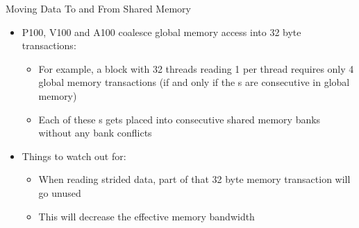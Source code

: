 \documentclass[aspectratio=43]{beamer}
\begin{document}
\begin{frame}[fragile]{Moving Data To and From Shared Memory}
    \begin{itemize}
        \item P100, V100 and A100 coalesce global memory access into 32 byte transactions:
        \begin{itemize}
            \item For example, a block with 32 threads reading 1  per thread requires only 4 global memory transactions (if and only if the s are consecutive in global memory)
            \item Each of these s gets placed into consecutive shared memory banks without any bank conflicts
        \end{itemize}
        \vspace{0.25cm}
        \item Things to watch out for:
            \begin{itemize}
                \item When reading strided data, part of that 32 byte memory transaction will go unused
                \item This will decrease the effective memory bandwidth
            \end{itemize}
        \end{itemize}

\end{frame}
\end{document}
